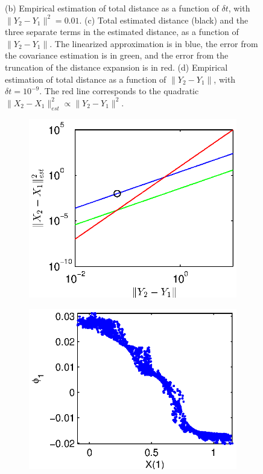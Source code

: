 \documentclass[1p]{elsarticle}
\begin{document}
\begin{figure}[h]
{%
(b) Empirical estimation of total distance as a function of $\delta t$, with $\|Y_2 - Y_1 \|^2 = 0.01$.  
%
(c) Total estimated distance (black) and the three separate terms in the estimated distance, as a function of $\|Y_2 - Y_1\|$. The linearized approximation is in blue, the error from the covariance estimation is in green, and the error from the truncation of the distance expansion is in red. 
%
(d) Empirical estimation of total distance as a function of $\|Y_2 - Y_1\|$, with $\delta t =  10^{-9}$. The red line corresponds to the quadratic $\|X_2 - X_1 \|^2_{est} \propto \|Y_2 - Y_1 \|^2$.}
\label{fig:empirical_estimation}
\end{figure}

\begin{figure}
\begin{subfigure}{0.5\textwidth}
\includegraphics[width=\textwidth]{changing_parameters_error_terms_1}
\caption{}
\end{subfigure}
\begin{subfigure}{0.5\textwidth}
\includegraphics[width=\textwidth]{changing_parameters_NIV_corr_1}
\caption{}
\end{subfigure}


\end{figure}
\end{document}
